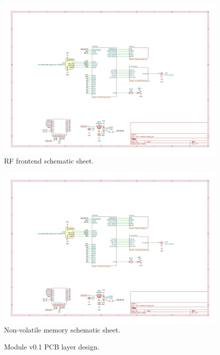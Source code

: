 \begin{figure}
    \includegraphics[page=3,angle=-90,width=\textwidth]{boards/v0.1/lora-module.pdf}
    \caption{\label{schematic:v0.1-3}RF frontend schematic sheet.}
\end{figure}
\begin{figure}
    \includegraphics[page=4,angle=-90,width=\textwidth]{boards/v0.1/lora-module.pdf}
    \caption{\label{schematic:v0.1-4}Non-volatile memory schematic sheet.}
\end{figure}

\begin{figure}
    \hfill
    \hfill
    \hfill
    \caption{\label{board:v0.1}Module v0.1 PCB layer design.}
\end{figure}

